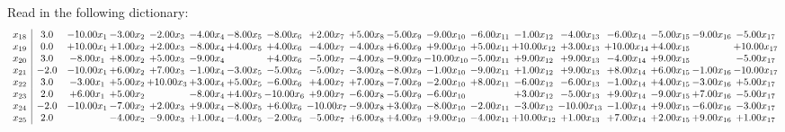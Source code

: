 \documentclass[9pt]{article}
\begin{document}
Read in the following dictionary:
\[\begin{array}{c| c c@{\hskip 2pt} c@{\hskip 2pt} c@{\hskip 2pt} c@{\hskip 2pt} c@{\hskip 2pt} c@{\hskip 2pt} c@{\hskip 2pt} c@{\hskip 2pt} c@{\hskip 2pt} c@{\hskip 2pt} c@{\hskip 2pt} c@{\hskip 2pt} c@{\hskip 2pt} c@{\hskip 2pt} c@{\hskip 2pt} c@{\hskip 2pt} c@{\hskip 2pt} }
 x_{18}   &  3.0 & -10.00 x_{1} & -3.00 x_{2} & -2.00 x_{3} & -4.00 x_{4} & -8.00 x_{5} & -8.00 x_{6} & +  2.00 x_{7} & +  5.00 x_{8} & -5.00 x_{9} & -9.00 x_{10} & -6.00 x_{11} & -1.00 x_{12} & -4.00 x_{13} & -6.00 x_{14} & -5.00 x_{15} & -9.00 x_{16} & -5.00 x_{17}\\
 x_{19}   &  0.0 & + 10.00 x_{1} & +  1.00 x_{2} & +  2.00 x_{3} & -8.00 x_{4} & +  4.00 x_{5} & +  4.00 x_{6} & -4.00 x_{7} & -4.00 x_{8} & +  6.00 x_{9} & +  9.00 x_{10} & +  5.00 x_{11} & + 10.00 x_{12} & +  3.00 x_{13} & + 10.00 x_{14} & +  4.00 x_{15} &   & + 10.00 x_{17}\\
 x_{20}   &  3.0 & -8.00 x_{1} & +  8.00 x_{2} & +  5.00 x_{3} & -9.00 x_{4} &   & +  4.00 x_{6} & -5.00 x_{7} & -4.00 x_{8} & -9.00 x_{9} & -10.00 x_{10} & -5.00 x_{11} & +  9.00 x_{12} & +  9.00 x_{13} & -4.00 x_{14} & +  9.00 x_{15} &   & -5.00 x_{17}\\
 x_{21}   &  -2.0 & -10.00 x_{1} & +  6.00 x_{2} & +  7.00 x_{3} & -1.00 x_{4} & -3.00 x_{5} & -5.00 x_{6} & -5.00 x_{7} & -3.00 x_{8} & -8.00 x_{9} & -1.00 x_{10} & -9.00 x_{11} & +  1.00 x_{12} & +  9.00 x_{13} & +  8.00 x_{14} & +  6.00 x_{15} & -1.00 x_{16} & -10.00 x_{17}\\
 x_{22}   &  3.0 & -3.00 x_{1} & +  5.00 x_{2} & + 10.00 x_{3} & +  3.00 x_{4} & +  5.00 x_{5} & -6.00 x_{6} & +  4.00 x_{7} & +  7.00 x_{8} & -7.00 x_{9} & -2.00 x_{10} & +  8.00 x_{11} & -6.00 x_{12} & -6.00 x_{13} & -1.00 x_{14} & +  4.00 x_{15} & -3.00 x_{16} & +  5.00 x_{17}\\
 x_{23}   &  2.0 & +  6.00 x_{1} & +  5.00 x_{2} &   & -8.00 x_{4} & +  4.00 x_{5} & -10.00 x_{6} & +  9.00 x_{7} & -6.00 x_{8} & -5.00 x_{9} & -6.00 x_{10} &   & +  3.00 x_{12} & -5.00 x_{13} & +  9.00 x_{14} & -9.00 x_{15} & +  7.00 x_{16} & -5.00 x_{17}\\
 x_{24}   &  -2.0 & -10.00 x_{1} & -7.00 x_{2} & +  2.00 x_{3} & +  9.00 x_{4} & -8.00 x_{5} & +  6.00 x_{6} & -10.00 x_{7} & -9.00 x_{8} & +  3.00 x_{9} & -8.00 x_{10} & -2.00 x_{11} & -3.00 x_{12} & -10.00 x_{13} & -1.00 x_{14} & +  9.00 x_{15} & -6.00 x_{16} & -3.00 x_{17}\\
 x_{25}   &  2.0  &   & -4.00 x_{2} & -9.00 x_{3} & +  1.00 x_{4} & -4.00 x_{5} & -2.00 x_{6} & -5.00 x_{7} & +  6.00 x_{8} & +  4.00 x_{9} & +  9.00 x_{10} & -4.00 x_{11} & + 10.00 x_{12} & +  1.00 x_{13} & +  7.00 x_{14} & +  2.00 x_{15} & +  9.00 x_{16} & +  1.00 x_{17}\\

\end{array}\]
\end{document}
